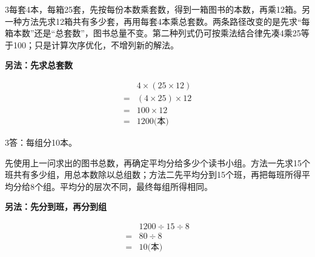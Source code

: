 \documentclass[multi=snippet,border={5bp 20bp 5bp 5bp}]{standalone}
\newenvironment{snippet}[3]{\begin{minipage}{#1bp}\color{answerred}\fontsize{#2}{#3}\selectfont\raggedright}{\end{minipage}}
\begin{document}
\begin{snippet}{505}{11.5}{14}\begin{multicols}{3}\raggedcolumns 每套4本，每箱25套，先按每份本数乘套数，得到一箱图书的本数，再乘12箱。另一种方法先求12箱共有多少套，再用每套4本乘总套数。两条路径改变的是先求“每箱本数”还是“总套数”，图书总量不变。第二种列式仍可按乘法结合律先凑4乘25等于100；只是计算次序优化，不增列新的解法。\par \textbf{另法：先求总套数}\par \[\begin{aligned}&4\times(25\times12)\\={}&(4\times25)\times12\\={}&100\times12\\={}&1200\text{(本)}\end{aligned}\]\end{multicols}\end{snippet}
\begin{snippet}{505}{11.5}{14}\begin{multicols}{3}\raggedcolumns 答：每组分10本。\par 先使用上一问求出的图书总数，再确定平均分给多少个读书小组。方法一先求15个班共有多少组，用总本数除以总组数；方法二先平均分到15个班，再把每班所得平均分给8个组。平均分的层次不同，最终每组所得相同。\par \textbf{另法：先分到班，再分到组}\par \[\begin{aligned} &1200\div15\div8\\={}&80\div8\\={}&10\text{(本)}\end{aligned}\]\end{multicols}\end{snippet}
\end{document}
